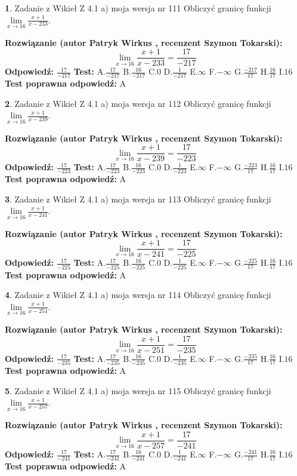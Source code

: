 \documentclass[12pt, a4paper]{article}
\theoremstyle{definition} %
\newtheorem{zad}{}
\newcommand{\zadStart}[1]{\begin{zad}#1\newline}
\newcommand{\zadStop}{\end{zad}}
\newcommand{\rozwStart}[2]{\noindent \textbf{Rozwiązanie (autor #1 , recenzent #2): }\newline}
\newcommand{\rozwStop}{\newline}
\newcommand{\odpStart}{\noindent \textbf{Odpowiedź:}\newline}
\newcommand{\odpStop}{\newline}
\newcommand{\testStart}{\noindent \textbf{Test:}\newline}
\newcommand{\testStop}{\newline}
\newcommand{\kluczStart}{\noindent \textbf{Test poprawna odpowiedź:}\newline}
\newcommand{\kluczStop}{\newline}
\begin{document}
\zadStart{Zadanie z Wikieł Z 4.1 a) moja wersja nr 111}
Obliczyć granicę funkcji $\lim\limits_{x\to16}\frac{x+1}{x-233}$.
\zadStop
\rozwStart{Patryk Wirkus}{Szymon Tokarski}
$$\lim\limits_{x\to16}\frac{x+1}{x-233} = \frac{17}{-217}$$
\rozwStop
\odpStart
$\frac{17}{-217}$
\odpStop
\testStart
A.$\frac{17}{-217}$
B.$\frac{16}{-217}$
C.$0$
D.$\frac{1}{-217}$
E.$\infty$
F.$-\infty$
G.$\frac{-217}{17}$
H.$\frac{16}{17}$
I.$16$
\testStop
\kluczStart
A
\kluczStop



\zadStart{Zadanie z Wikieł Z 4.1 a) moja wersja nr 112}
Obliczyć granicę funkcji $\lim\limits_{x\to16}\frac{x+1}{x-239}$.
\zadStop
\rozwStart{Patryk Wirkus}{Szymon Tokarski}
$$\lim\limits_{x\to16}\frac{x+1}{x-239} = \frac{17}{-223}$$
\rozwStop
\odpStart
$\frac{17}{-223}$
\odpStop
\testStart
A.$\frac{17}{-223}$
B.$\frac{16}{-223}$
C.$0$
D.$\frac{1}{-223}$
E.$\infty$
F.$-\infty$
G.$\frac{-223}{17}$
H.$\frac{16}{17}$
I.$16$
\testStop
\kluczStart
A
\kluczStop



\zadStart{Zadanie z Wikieł Z 4.1 a) moja wersja nr 113}
Obliczyć granicę funkcji $\lim\limits_{x\to16}\frac{x+1}{x-241}$.
\zadStop
\rozwStart{Patryk Wirkus}{Szymon Tokarski}
$$\lim\limits_{x\to16}\frac{x+1}{x-241} = \frac{17}{-225}$$
\rozwStop
\odpStart
$\frac{17}{-225}$
\odpStop
\testStart
A.$\frac{17}{-225}$
B.$\frac{16}{-225}$
C.$0$
D.$\frac{1}{-225}$
E.$\infty$
F.$-\infty$
G.$\frac{-225}{17}$
H.$\frac{16}{17}$
I.$16$
\testStop
\kluczStart
A
\kluczStop



\zadStart{Zadanie z Wikieł Z 4.1 a) moja wersja nr 114}
Obliczyć granicę funkcji $\lim\limits_{x\to16}\frac{x+1}{x-251}$.
\zadStop
\rozwStart{Patryk Wirkus}{Szymon Tokarski}
$$\lim\limits_{x\to16}\frac{x+1}{x-251} = \frac{17}{-235}$$
\rozwStop
\odpStart
$\frac{17}{-235}$
\odpStop
\testStart
A.$\frac{17}{-235}$
B.$\frac{16}{-235}$
C.$0$
D.$\frac{1}{-235}$
E.$\infty$
F.$-\infty$
G.$\frac{-235}{17}$
H.$\frac{16}{17}$
I.$16$
\testStop
\kluczStart
A
\kluczStop



\zadStart{Zadanie z Wikieł Z 4.1 a) moja wersja nr 115}
Obliczyć granicę funkcji $\lim\limits_{x\to16}\frac{x+1}{x-257}$.
\zadStop
\rozwStart{Patryk Wirkus}{Szymon Tokarski}
$$\lim\limits_{x\to16}\frac{x+1}{x-257} = \frac{17}{-241}$$
\rozwStop
\odpStart
$\frac{17}{-241}$
\odpStop
\testStart
A.$\frac{17}{-241}$
B.$\frac{16}{-241}$
C.$0$
D.$\frac{1}{-241}$
E.$\infty$
F.$-\infty$
G.$\frac{-241}{17}$
H.$\frac{16}{17}$
I.$16$
\testStop
\kluczStart
A
\kluczStop
\end{document}
